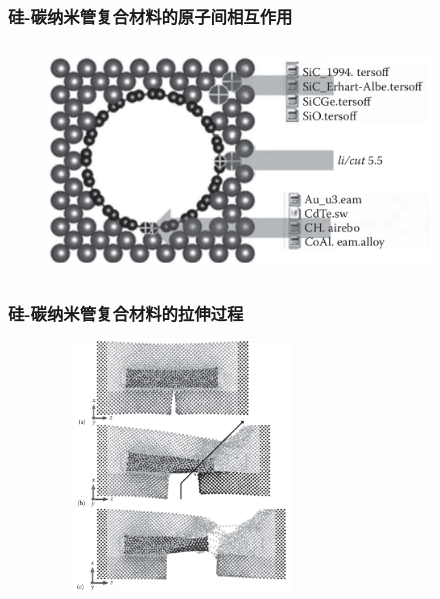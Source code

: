 
\frame
{
	\frametitle{硅-碳纳米管复合材料的原子间相互作用}
\begin{figure}[h!]
\centering
\vskip -5pt
\includegraphics[height=2.40in,width=4.0in, viewport=0 0 940 540,clip]{Figures/Lammps_tutorial-15-three_potentials-adopted-for_Si-CNT_and_their-interface.png}
\caption{\fontsize{6.2pt}{5.2pt}}%
\label{LAMMPS_Potential-Si-CNT}
\end{figure}
}

\frame
{
	\frametitle{硅-碳纳米管复合材料的拉伸过程}
\begin{figure}[h!]
\centering
\vskip -10pt
\includegraphics[height=2.60in,width=2.8in, viewport=0 0 770 820,clip]{Figures/Lammps_tutorial-15-snapshots_of_the Si-CNT_composite_system_under-tension-for-various-strains.png}
\caption{\fontsize{6.2pt}{5.2pt}}%
\label{LAMMPS_Si_CNT-under-tension}
\end{figure}
}

